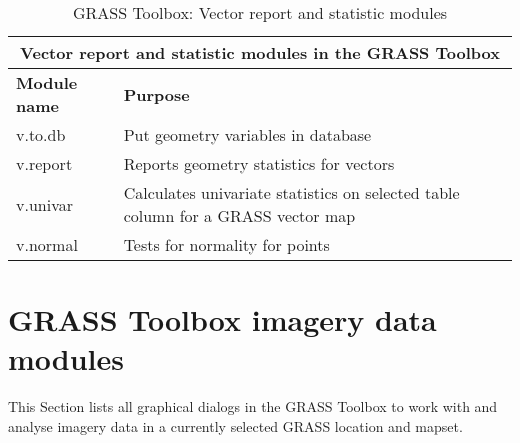 \begin{table}[H]
\centering
 \begin{tabular}{|p{4cm}|p{10cm}|}
  \hline \multicolumn{2}{|c|}{\textbf{Vector report and statistic modules in the GRASS
  Toolbox}} \\
  \hline \textbf{Module name} & \textbf{Purpose} \\
  \hline v.to.db & Put geometry variables in database \\
  \hline v.report & Reports geometry statistics for vectors \\
  \hline v.univar & Calculates univariate statistics on selected table column
  for a GRASS vector map \\
  \hline v.normal & Tests for normality for points\\
\hline
\end{tabular}
\caption{GRASS Toolbox: Vector report and statistic modules}
\end{table}

\clearpage

\section{GRASS Toolbox imagery data modules}

This Section lists all graphical dialogs in the GRASS Toolbox to work with
and analyse imagery data in a currently selected GRASS location and mapset.

